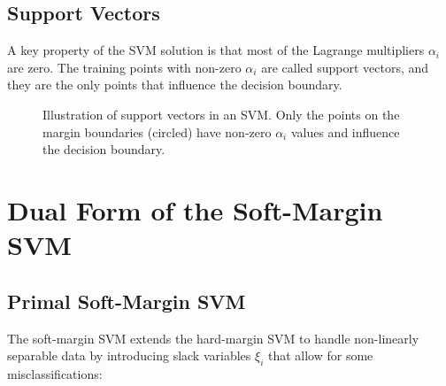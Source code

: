 \documentclass{article}
\begin{document}
\subsection{Support Vectors}
A key property of the SVM solution is that most of the Lagrange multipliers $\alpha_i$ are zero. The training points with non-zero $\alpha_i$ are called support vectors, and they are the only points that influence the decision boundary.

\begin{figure}[h]
\centering
{}
\caption{Illustration of support vectors in an SVM. Only the points on the margin boundaries (circled) have non-zero $\alpha_i$ values and influence the decision boundary.}
\end{figure}

\section{Dual Form of the Soft-Margin SVM}

\subsection{Primal Soft-Margin SVM}
The soft-margin SVM extends the hard-margin SVM to handle non-linearly separable data by introducing slack variables $\xi_i$ that allow for some misclassifications:
\end{document}
